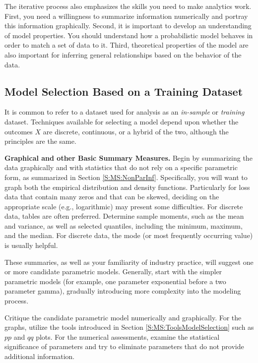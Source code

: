 \documentclass[]{book}
\theoremstyle{definition}
\theoremstyle{definition}
\theoremstyle{definition}
\theoremstyle{remark}
\begin{document}
The iterative process also emphasizes the skills you need to make
analytics work. First, you need a willingness to summarize information
numerically and portray this information graphically. Second, it is
important to develop an understanding of model properties. You should
understand how a probabilistic model behaves in order to match a set of
data to it. Third, theoretical properties of the model are also
important for inferring general relationships based on the behavior of
the data.

\subsection{Model Selection Based on a Training
Dataset}\label{model-selection-based-on-a-training-dataset}

It is common to refer to a dataset used for analysis as an
\emph{in-sample} or \emph{training} dataset. Techniques available for
selecting a model depend upon whether the outcomes \(X\) are discrete,
continuous, or a hybrid of the two, although the principles are the
same.

\textbf{Graphical and other Basic Summary Measures.} Begin by
summarizing the data graphically and with statistics that do not rely on
a specific parametric form, as summarized in Section
\ref{S:MS:NonParInf}. Specifically, you will want to graph both the
empirical distribution and density functions. Particularly for loss data
that contain many zeros and that can be skewed, deciding on the
appropriate scale (e.g., logarithmic) may present some difficulties. For
discrete data, tables are often preferred. Determine sample moments,
such as the mean and variance, as well as selected quantiles, including
the minimum, maximum, and the median. For discrete data, the mode (or
most frequently occurring value) is usually helpful.

These summaries, as well as your familiarity of industry practice, will
suggest one or more candidate parametric models. Generally, start with
the simpler parametric models (for example, one parameter exponential
before a two parameter gamma), gradually introducing more complexity
into the modeling process.

Critique the candidate parametric model numerically and graphically. For
the graphs, utilize the tools introduced in Section
\ref{S:MS:ToolsModelSelection} such as \(pp\) and \(qq\) plots. For the
numerical assessments, examine the statistical significance of
parameters and try to eliminate parameters that do not provide
additional information.
\end{document}
